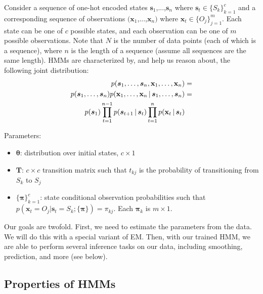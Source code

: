 \documentclass[12pt]{article}
\begin{document}
Consider a sequence of one-hot encoded states $\mathbf{s}_1$,...,$\mathbf{s}_n$ where $\mathbf{s}_t \in \{S_k\}_{k=1}^c$ and a corresponding sequence of observations
$(\mathbf{x}_1$,...,$\mathbf{x}_n)$ where $\mathbf{x}_t \in \{O_j\}_{j=1}^m$. Each state can be one of $c$ possible states, and each observation can be one of $m$ possible observations. Note that $N$ is the number of data points (each of which is a sequence), where $n$ is the length of a sequence (assume all sequences are the same length). HMMs are characterized by, and help us reason about, the following joint distribution:
\begin{align*}
p(\boldsymbol{s}_1,\ldots,\boldsymbol{s}_n,\mathbf{x}_1,\ldots,\mathbf{x}_n) &= \\ 
p(\boldsymbol{s}_1,\ldots,\boldsymbol{s}_n)p(\mathbf{x}_1,\ldots,\mathbf{x}_n\,|\, \boldsymbol{s}_1,\ldots,\boldsymbol{s}_n) &= \\p(\boldsymbol{s}_1)\prod_{t=1}^{n-1}p(\boldsymbol{s}_{t+1}\,|\, \boldsymbol{s}_{t})\prod_{t=1}^n p(\mathbf{x}_t\,|\,\boldsymbol{s}_t)
\end{align*}

Parameters:

\begin{itemize}
	
	\item $\boldsymbol{\theta}$: distribution over initial states, $c \times 1$
	
	\item $\mathbf{T}$: $c \times c$ transition matrix such that $t_{kj}$ is the probability of transitioning from $S_k$ to $S_j$
	
	\item $\{\boldsymbol{\pi}\}_{k=1}^c$: state conditional observation probabilities such that $p(\mathbf{x}_t = O_j | \mathbf{s}_t = S_k; \{\boldsymbol{\pi}\}) = \pi_{kj}$. Each $\boldsymbol{\pi}_k$ is $m \times 1$.
	
\end{itemize}

Our goals are twofold. First, we need to estimate the parameters from the data. We will do this with a special variant of EM. Then, with our trained HMM, we are able to perform several inference tasks on our data, including smoothing, prediction, and more (see below).


\subsection{Properties of HMMs}
\end{document}
